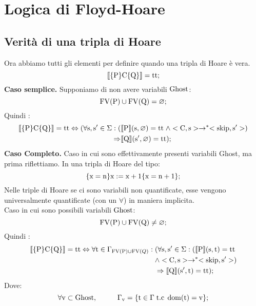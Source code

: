 \documentclass[a4paper, 12pt, oneside,fleqn]{book}
\begin{document}
\chapter{Logica di Floyd-Hoare}
\section{Verità di una tripla di Hoare}
Ora abbiamo tutti gli elementi per definire quando una tripla di Hoare è vera.
$$\llbracket \{\mathrm{P}\}\mathrm{C}\{\mathrm{Q}\} \rrbracket = \mathrm{tt};$$
\textbf{Caso semplice.} Supponiamo di non avere variabili $\mathrm{Ghost}$:
$$\mathrm{FV}(\mathrm{P}) \cup \mathrm{FV}(\mathrm{Q})= \varnothing;$$
Quindi :
\begin{align*}
\llbracket \{\mathrm{P}\}\mathrm{C}\{\mathrm{Q}\} \rrbracket = \mathrm{tt} \Leftrightarrow (\forall \mathrm{s},\mathrm{s}'\in \Sigma \mathrel{:}(&\llbracket \mathrm{P} \rrbracket(\mathrm{s},\varnothing) = \mathrm{tt} \hspace{1mm}\wedge <\mathrm{C},\mathrm{s}>\rightarrow ^*<\mathrm{skip},\mathrm{s}'>) \\
\Rightarrow&\llbracket \mathrm{Q} \rrbracket(\mathrm{s}',\varnothing)=\mathrm{tt});
\end{align*}
\textbf{Caso Completo.} Caso in cui sono effettivamente presenti variabili Ghost, ma prima riflettiamo. In una tripla di Hoare del tipo:
$$\{\mathrm{x} = \mathrm{n}\} \mathrm{x}:=\mathrm{x}+1\{\mathrm{x}=\mathrm{n}+1\};$$
Nelle triple di Hoare se ci sono variabili non quantificate, esse vengono universalmente quantificate (con un $\forall$) in maniera implicita.\\
Caso in cui sono possibili variabili $\mathrm{Ghost}$:
$$\mathrm{FV}(\mathrm{P}) \cup \mathrm{FV}(\mathrm{Q}) \neq \varnothing;$$
Quindi :\\
\begin{align*}
\llbracket \{\mathrm{P}\}\mathrm{C}\{\mathrm{Q}\} \rrbracket = \mathrm{tt} \Leftrightarrow \forall \mathrm{t} \in \Gamma_{\mathrm{FV}(\mathrm{P})\cup \mathrm{FV}(Q)}\mathrel{:}\hspace{1mm}&(\forall \mathrm{s},\mathrm{s}'\in \Sigma\mathrel{:}(\llbracket \mathrm{P} \rrbracket(\mathrm{s},\mathrm{t}) = \mathrm{tt} \\ &\wedge <\mathrm{C},\mathrm{s}>\rightarrow ^*<\mathrm{skip},\mathrm{s}'>) \\ &\Rightarrow\llbracket \mathrm{Q} \rrbracket(\mathrm{s}',\mathrm{t})=\mathrm{tt});
\end{align*}
Dove:\\
$$\forall \mathrm{v} \subset \mathrm{Ghost}, \hspace{1cm} \Gamma_{\mathrm{v}} =\{ \mathrm{t} \in \Gamma \hspace{1mm}\text{t.c} \hspace{1mm} \mathop{\mathrm{dom}}\nolimits(\mathrm{t}) = \mathrm{v}\};$$
\end{document}
